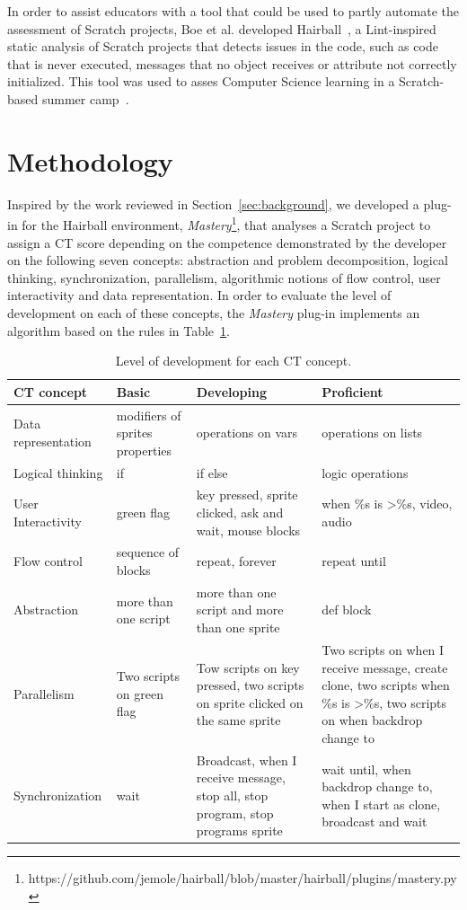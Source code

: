 \documentclass[a4paper,11pt]{article}
\begin{document}
In order to assist educators with a tool that could be used to partly automate the assessment of Scratch projects, Boe et al. developed Hairball~\cite{boe2013hairball}, a Lint-inspired static analysis of Scratch projects that detects issues in the code, such as code that is never executed, messages that no object receives or attribute not correctly initialized. This tool was used to asses Computer Science learning in a Scratch-based summer camp~\cite{franklin2013assessment}. 

\section{Methodology}
\label{sec:methodology}

Inspired by the work reviewed in Section~\ref{sec:background}, we developed a plug-in for the Hairball environment, \textit{Mastery}\footnote{https://github.com/jemole/hairball/blob/master/hairball/plugins/mastery.py}, that analyses a Scratch project to assign a CT score depending on the competence demonstrated by the developer on the following seven concepts: abstraction and problem decomposition, logical thinking, synchronization, parallelism, algorithmic notions of flow control, user interactivity and data representation. In order to evaluate the level of development on each of these concepts, the \textit{Mastery} plug-in implements an algorithm based on the rules in Table~\ref{table:CTscore}.

\begin{table}[t]
\centering
\begin{tabular}{|l|p{2.7cm}|p{3cm}|p{4cm}|}
\hline
CT concept & Basic & Developing & Proficient\\ %
\hline
\hline  
Data representation & modifiers of sprites properties &
operations on vars & operations on lists  \\
\hline
Logical thinking & if & if else & logic operations \\ 
\hline
User Interactivity & green flag & key pressed, sprite clicked, ask and wait,
mouse blocks & when \%s is \textgreater \%s, video, audio \\ 
\hline
Flow control & sequence of blocks & repeat, forever & repeat until \\ 
\hline
Abstraction & more than one script & more than one script and more than one sprite & def block\\
\hline
Parallelism & Two scripts on green flag & Tow scripts on key pressed, two scripts on sprite clicked on the same sprite & Two scripts on when I receive message, create clone, two scripts when \%s is \textgreater \%s, two scripts on when backdrop change to \\
\hline
Synchronization & wait & Broadcast, when I receive message, stop all, stop program, stop programs sprite & wait until, when backdrop change to, when I start as clone, broadcast and wait \\ 
\hline
\end{tabular}
\caption{Level of development for each CT concept.}
\label{table:CTscore}
\end{table}
\end{document}

